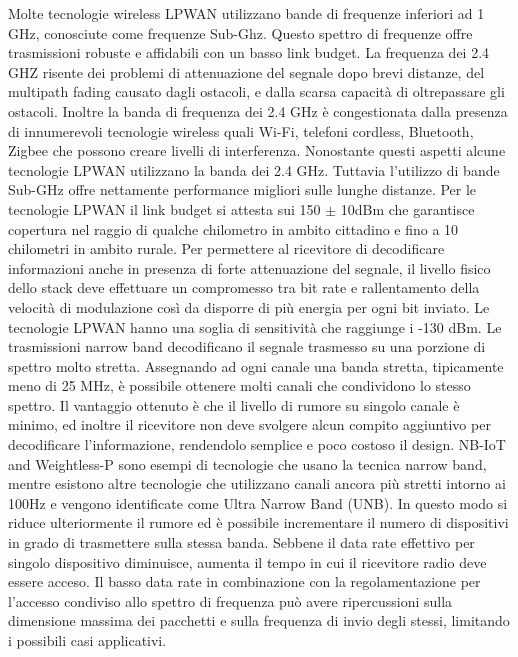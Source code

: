 \documentclass[12pt,a4paper,openright,twoside]{report}
\begin{document}
Molte tecnologie wireless LPWAN utilizzano bande di frequenze inferiori ad 1 GHz, conosciute come frequenze Sub-Ghz. 
Questo spettro di frequenze offre trasmissioni robuste e affidabili con un basso link budget. 
La frequenza dei 2.4 GHZ risente dei problemi di attenuazione del segnale dopo brevi distanze, del multipath fading causato dagli ostacoli, e dalla scarsa capacit\`a di oltrepassare gli ostacoli. 
Inoltre la banda di frequenza dei 2.4 GHz \`e congestionata dalla presenza di innumerevoli tecnologie wireless quali Wi-Fi, telefoni cordless, Bluetooth, Zigbee che possono creare livelli di interferenza. 
Nonostante questi aspetti alcune tecnologie LPWAN utilizzano la banda dei 2.4 GHz. Tuttavia l'utilizzo di bande Sub-GHz offre nettamente performance migliori sulle lunghe distanze.
Per le tecnologie LPWAN il link budget si attesta sui 150 $\pm$ 10dBm che garantisce copertura nel raggio di qualche chilometro in ambito cittadino e fino a 10 chilometri in ambito rurale. 
Per permettere al ricevitore di decodificare informazioni anche in presenza di forte attenuazione del segnale, il livello fisico dello stack deve effettuare un compromesso tra bit rate e rallentamento della velocit\`a di modulazione cos\`i da disporre di pi\`u energia per ogni bit inviato. 
Le tecnologie LPWAN hanno una soglia di sensitivit\`a che raggiunge i -130 dBm.
Le trasmissioni narrow band decodificano il segnale trasmesso su una porzione di spettro molto stretta.
Assegnando ad ogni canale una banda stretta, tipicamente meno di 25 MHz, \`e possibile ottenere molti canali che condividono lo stesso spettro. 
Il vantaggio ottenuto \`e che il livello di rumore su singolo canale \`e minimo, ed inoltre il ricevitore non deve svolgere alcun compito aggiuntivo per decodificare l'informazione, rendendolo semplice e poco costoso il design.  
NB-IoT and Weightless-P sono esempi di tecnologie che usano la tecnica narrow band, mentre esistono altre tecnologie che utilizzano canali ancora pi\`u stretti intorno ai 100Hz e vengono identificate come Ultra Narrow Band (UNB). 
In questo modo si riduce ulteriormente il rumore ed \`e possibile incrementare il numero di dispositivi in grado di trasmettere sulla stessa banda. Sebbene il data rate effettivo per singolo dispositivo diminuisce, aumenta il tempo in cui il ricevitore radio deve essere acceso. Il basso data rate in combinazione con la regolamentazione per l'accesso condiviso allo spettro di frequenza pu\`o avere ripercussioni sulla dimensione massima dei pacchetti e sulla frequenza di invio degli stessi, limitando i possibili casi applicativi.
\end{document}
